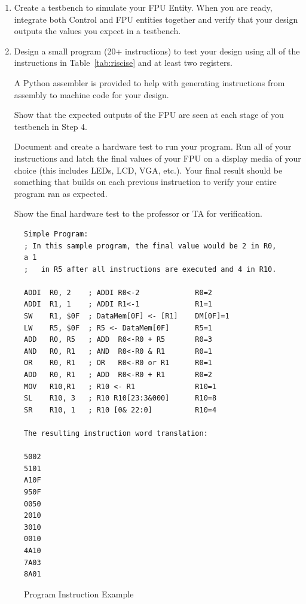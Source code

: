 \documentclass{article}
\begin{document}
\begin{enumerate}
  \item Create a testbench to simulate your FPU Entity. When you are ready, integrate both Control and FPU entities together and verify that your design outputs the values you expect in a testbench.

  \item Design a small program (20+ instructions) to test your design using all of the instructions in Table~\ref{tab:riscise} and at least two registers.
  
  A Python assembler is provided to help with generating instructions from assembly to machine code for your design.

	Show that the expected outputs of the FPU are seen at each stage of you testbench in Step 4.

	Document and create a hardware test to run your program. Run all of your instructions and latch the final values of your FPU on a display media of your choice (this includes LEDs, LCD, VGA, etc.). Your final result should be something that builds on each previous instruction to verify your entire program ran as expected.

Show the final hardware test to the professor or TA for verification.
  
\end{enumerate}

\begin{figure}[!htbp]
  \centering
    \begin{Verbatim}[frame=single]
Simple Program:
; In this sample program, the final value would be 2 in R0, a 1 
;   in R5 after all instructions are executed and 4 in R10.

ADDI  R0, 2    ; ADDI R0<-2             R0=2
ADDI  R1, 1    ; ADDI R1<-1             R1=1
SW    R1, $0F  ; DataMem[0F] <- [R1]    DM[0F]=1
LW    R5, $0F  ; R5 <- DataMem[0F]      R5=1
ADD   R0, R5   ; ADD  R0<-R0 + R5       R0=3
AND   R0, R1   ; AND  R0<-R0 & R1       R0=1
OR    R0, R1   ; OR   R0<-R0 or R1      R0=1
ADD   R0, R1   ; ADD  R0<-R0 + R1       R0=2
MOV   R10,R1   ; R10 <- R1              R10=1
SL    R10, 3   ; R10 R10[23:3&000]      R10=8
SR    R10, 1   ; R10 [0& 22:0]          R10=4

The resulting instruction word translation:

5002
5101
A10F
950F
0050
2010
3010
0010
4A10
7A03
8A01
    \end{Verbatim}
  \caption{Program Instruction Example}
  \label{fig:instruction_example}
\end{figure}
\end{document}
